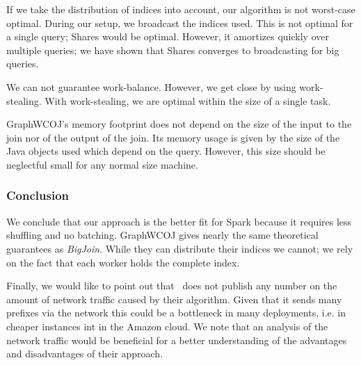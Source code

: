 If we take the distribution of indices into account, our algorithm is not worst-case optimal.
During our setup, we broadcast the indices used.
This is not optimal for a single query;
Shares would be optimal.
However, it amortizes quickly over multiple queries;
we have shown that Shares converges to broadcasting for big queries.

We can not guarantee work-balance.
However, we get close by using work-stealing.
With work-stealing, we are optimal within the size of a single task.

GraphWCOJ's memory footprint does not depend on the size of the input to the join nor of the output of the join.
Its memory usage is given by the size of the Java objects used which depend on the query.
However, this size should be neglectful small for any normal size machine.

\subsubsection{Conclusion}
We conclude that our approach is the better fit for Spark because it requires less shuffling and no batching.
GraphWCOJ gives nearly the same theoretical guarantees as \textit{BigJoin}.
While they can distribute their indices we cannot;
we rely on the fact that each worker holds the complete index.

Finally, we would like to point out that~\cite{ammar2018distributed} does not publish any number on the amount
of network traffic caused by their algorithm.
Given that it sends many prefixes via the network this could be a bottleneck in many deployments, i.e. in cheaper instances
int in the Amazon cloud.
We note that an analysis of the network traffic would be beneficial for a better understanding of the advantages and disadvantages
of their approach.




